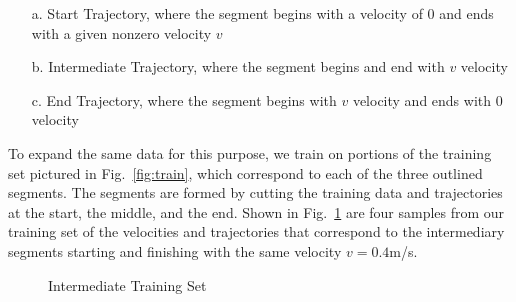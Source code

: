 \documentclass[letterpaper, 10 pt, conference]{ieeeconf}  %
\newcommand\NB[1]{$\spadesuit$\footnote{NB: #1}}
\begin{document}
\begin{itemize}
    \item[a.] Start Trajectory, where the segment begins with a velocity of $0$ and ends with a given nonzero velocity $v$
    \item[b.] Intermediate Trajectory, where the segment begins and end with $v$ velocity
    \item[c.] End Trajectory, where the segment begins with $v$ velocity and ends with $0$ velocity
\end{itemize}
To expand the same data for this purpose, we train on portions of the training set pictured in Fig.~\ref{fig:train}, which correspond to each of the three outlined segments. The segments are formed by cutting the training data and trajectories at the start, the middle, and the end. Shown in Fig.~\ref{fig:trainelab} are four samples from our training set of the velocities and trajectories that correspond to the intermediary segments starting and finishing with the same velocity $v=0.4$m/s. %
\begin{figure}[H]
	\centering
	\caption{Intermediate Training Set}
	\label{fig:trainelab}
\end{figure}
\end{document}
